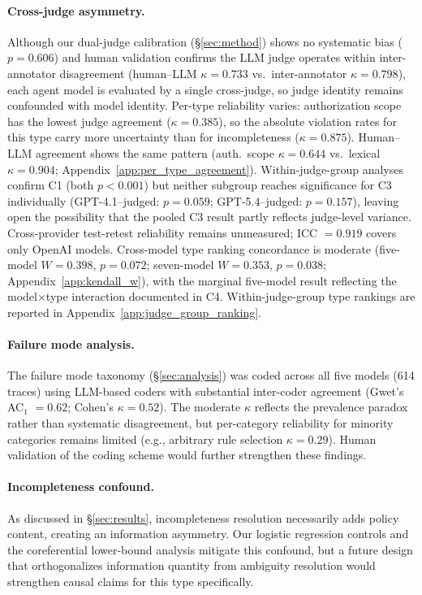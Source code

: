 \paragraph{Cross-judge asymmetry.} Although our dual-judge calibration (\S\ref{sec:method}) shows no systematic bias ($p = 0.606$) and human validation confirms the LLM judge operates within inter-annotator disagreement (human--LLM $\kappa = 0.733$ vs.\ inter-annotator $\kappa = 0.798$), each agent model is evaluated by a single cross-judge, so judge identity remains confounded with model identity. Per-type reliability varies: authorization scope has the lowest judge agreement ($\kappa = 0.385$), so the absolute violation rates for this type carry more uncertainty than for incompleteness ($\kappa = 0.875$). Human--LLM agreement shows the same pattern (auth.\ scope $\kappa = 0.644$ vs.\ lexical $\kappa = 0.904$; Appendix~\ref{app:per_type_agreement}). Within-judge-group analyses confirm C1 (both $p < 0.001$) but neither subgroup reaches significance for C3 individually (GPT-4.1--judged: $p = 0.059$; GPT-5.4--judged: $p = 0.157$), leaving open the possibility that the pooled C3 result partly reflects judge-level variance.
Cross-provider test-retest reliability remains unmeasured; ICC $= 0.919$ covers only OpenAI models. Cross-model type ranking concordance is moderate (five-model $W = 0.398$, $p = 0.072$; seven-model $W = 0.353$, $p = 0.038$; Appendix~\ref{app:kendall_w}), with the marginal five-model result reflecting the model$\times$type interaction documented in C4. Within-judge-group type rankings are reported in Appendix~\ref{app:judge_group_ranking}.

\paragraph{Failure mode analysis.} The failure mode taxonomy (\S\ref{sec:analysis}) was coded across all five models (614 traces) using LLM-based coders with substantial inter-coder agreement (Gwet's AC$_1$ $= 0.62$; Cohen's $\kappa = 0.52$). The moderate $\kappa$ reflects the prevalence paradox rather than systematic disagreement, but per-category reliability for minority categories remains limited (e.g., arbitrary rule selection $\kappa = 0.29$). Human validation of the coding scheme would further strengthen these findings.

\paragraph{Incompleteness confound.} As discussed in \S\ref{sec:results}, incompleteness resolution necessarily adds policy content, creating an information asymmetry. Our logistic regression controls and the coreferential lower-bound analysis mitigate this confound, but a future design that orthogonalizes information quantity from ambiguity resolution would strengthen causal claims for this type specifically.

